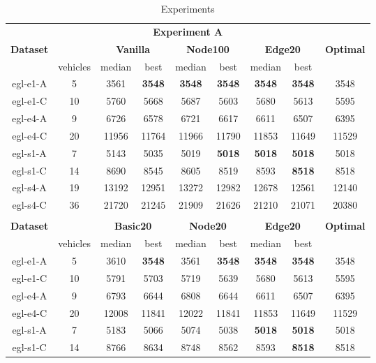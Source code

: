 \documentclass[twoside]{ctuthesis}
\theoremstyle{plain}
\theoremstyle{definition}
\theoremstyle{note}
\begin{document}
\begin{table}[htbp]
	\centering
	\caption{Experiments}
	\label{tab:tablebig}
	\begin{tabular}{|c|c|cc|cc|cc|c|}
		\hline
		\multicolumn{9}{|c|}{\textbf{Experiment A}}\\ 
		\multicolumn{1}{|c}{\textbf{Dataset}}&\multicolumn{1}{c}{}&\multicolumn{2}{c}{\textbf{Vanilla}}&\multicolumn{2}{c}{\textbf{Node100}}&\multicolumn{2}{c}{\textbf{Edge20}}&\textbf{Optimal} \\ \hline
		&vehicles&median&best&median&best&median&best& \\ \hline
		egl-e1-A &5&3561&\textbf{3548}&\textbf{3548}&\textbf{3548}&\textbf{3548}&\textbf{3548}&3548 \\ \hline
		egl-e1-C &10& 5760&5668&5687&5603&5680&5613&5595\\ \hline
		egl-e4-A &9& 6726&6578&6721&6617&6611&6507&6395\\ \hline
		egl-e4-C &20& 11956&11764&11966&11790&11853&11649&11529 \\ \hline
		egl-s1-A &7& 5143&5035&5019&\textbf{5018}&\textbf{5018}&\textbf{5018}&5018 \\ \hline
		egl-s1-C &14& 8690&8545&8605&8519&8593&\textbf{8518}&8518\\ \hline
		egl-s4-A &19& 13192&12951&13272&12982&12678&12561&12140 \\ \hline
		egl-s4-C &36& 21720&21245&21909&21626&21210&21071&20380\\ \hhline{|=========|}
		\multicolumn{9}{|c|}{\textbf{Experiment B}}\\ 
		\multicolumn{1}{|c}{\textbf{Dataset}}&\multicolumn{1}{c}{}&\multicolumn{2}{c}{\textbf{Basic20}}&\multicolumn{2}{c}{\textbf{Node20}}&\multicolumn{2}{c}{\textbf{Edge20}}&\textbf{Optimal} \\ \hline
		&vehicles&median&best&median&best&median&best&\\ \hline
		egl-e1-A &5&3610&\textbf{3548}&3561&\textbf{3548}&\textbf{3548}&\textbf{3548}&3548\\ \hline
		egl-e1-C &10&5791&5703&5719&5639&5680&5613&5595\\ \hline
		egl-e4-A &9&6793&6644&6808&6644&6611&6507&6395\\ \hline
		egl-e4-C &20&12008&11841&12022&11841&11853&11649&11529\\ \hline
		egl-s1-A &7&5183&5066&5074&5038&\textbf{5018}&\textbf{5018}&5018\\ \hline
		egl-s1-C &14&8766&8634&8748&8562&8593&\textbf{8518}&8518\\ \hline

\end{tabular}
\end{table}
\end{document}
